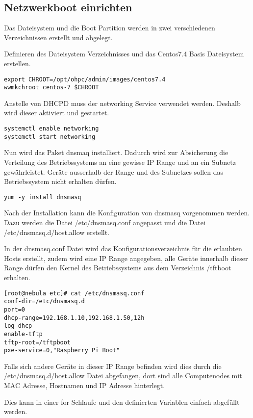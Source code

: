 \subsection{Netzwerkboot einrichten}
Das Dateisystem und die Boot Partition werden in zwei verschiedenen Verzeichnissen erstellt und abgelegt.

Definieren des Dateisystem Verzeichnisses und das Centos7.4 Basis Dateisystem erstellen.
\begin{lstlisting}
export CHROOT=/opt/ohpc/admin/images/centos7.4
wwmkchroot centos-7 $CHROOT
\end{lstlisting}

Anstelle von DHCPD muss der networking Service verwendet werden. Deshalb wird dieser aktiviert und gestartet.
\begin{lstlisting}
systemctl enable networking
systemctl start networking
\end{lstlisting}

Nun wird das Paket dnsmaq installiert. Dadurch wird zur Absicherung die Verteilung des Betriebssystems an eine gewisse IP Range und an ein Subnetz gewährleistet. Geräte ausserhalb der Range und des Subnetzes sollen das Betriebssystem nicht erhalten dürfen.

\begin{lstlisting}
yum -y install dnsmasq
\end{lstlisting}

Nach der Installation kann die Konfiguration von dnsmasq vorgenommen werden. Dazu werden die Datei /etc/dnsmasq.conf angepasst und die Datei /etc/dnsmasq.d/host.allow erstellt.

In der dnsmasq.conf Datei wird das Konfigurationsverzeichnis für die erlaubten Hosts erstellt, zudem wird eine IP Range angegeben, alle Geräte innerhalb dieser Range dürfen den Kernel des Betriebssystems aus dem Verzeichnis /tftboot erhalten.  
\begin{lstlisting}
[root@nebula etc]# cat /etc/dnsmasq.conf
conf-dir=/etc/dnsmasq.d
port=0
dhcp-range=192.168.1.10,192.168.1.50,12h
log-dhcp
enable-tftp
tftp-root=/tftpboot
pxe-service=0,"Raspberry Pi Boot"
\end{lstlisting}

Falls sich andere Geräte in dieser IP Range befinden wird dies durch die /etc/dnsmasq.d/host.allow Datei abgefangen, dort sind alle Computenodes mit MAC Adresse, Hostnamen und IP Adresse hinterlegt.

Dies kann in einer for Schlaufe und den definierten Variablen einfach abgefüllt werden.


